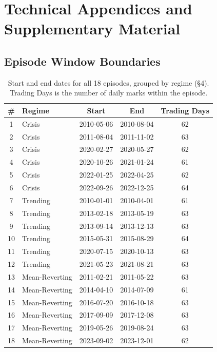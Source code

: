 \documentclass{article}
\begin{document}
\appendix
\renewcommand{\thetable}{A\arabic{table}}
\setcounter{table}{0}
\section{Technical Appendices and Supplementary Material}
\subsection{Episode Window Boundaries}
\begin{table}[h]
  \caption{Start and end dates for all 18 episodes, grouped by regime (\S4). Trading Days is the number of daily marks within the episode.}
  \label{tab:episodes}
  \centering
  \small
  \begin{tabular}{clccc}
    \toprule
    \# & Regime & Start & End & Trading Days \\
    \midrule
    1 & Crisis & 2010-05-06 & 2010-08-04 & 62 \\
    2 & Crisis & 2011-08-04 & 2011-11-02 & 63 \\
    3 & Crisis & 2020-02-27 & 2020-05-27 & 62 \\
    4 & Crisis & 2020-10-26 & 2021-01-24 & 61 \\
    5 & Crisis & 2022-01-25 & 2022-04-25 & 62 \\
    6 & Crisis & 2022-09-26 & 2022-12-25 & 64 \\
    7 & Trending & 2010-01-01 & 2010-04-01 & 61 \\
    8 & Trending & 2013-02-18 & 2013-05-19 & 63 \\
    9 & Trending & 2013-09-14 & 2013-12-13 & 63 \\
    10 & Trending & 2015-05-31 & 2015-08-29 & 64 \\
    11 & Trending & 2020-07-15 & 2020-10-13 & 63 \\
    12 & Trending & 2021-05-23 & 2021-08-21 & 63 \\
    13 & Mean-Reverting & 2011-02-21 & 2011-05-22 & 63 \\
    14 & Mean-Reverting & 2014-04-10 & 2014-07-09 & 61 \\
    15 & Mean-Reverting & 2016-07-20 & 2016-10-18 & 63 \\
    16 & Mean-Reverting & 2017-09-09 & 2017-12-08 & 63 \\
    17 & Mean-Reverting & 2019-05-26 & 2019-08-24 & 63 \\
    18 & Mean-Reverting & 2023-09-02 & 2023-12-01 & 62 \\
    \bottomrule
  \end{tabular}
\end{table}
\end{document}
